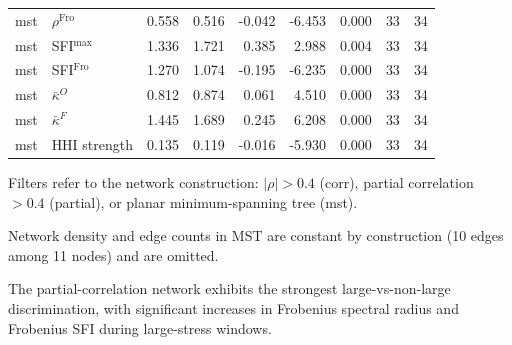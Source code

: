 \begin{table}[!htbp]
\begin{threeparttable}
\begin{tabular}{llrrrrrrr}
mst & $\rho^{\mathrm{Fro}}$ & 0.558 & 0.516 & -0.042 & -6.453 & 0.000 & 33 & 34 \\
mst & SFI$^{\max}$ & 1.336 & 1.721 & 0.385 & 2.988 & 0.004 & 33 & 34 \\
mst & SFI$^{\mathrm{Fro}}$ & 1.270 & 1.074 & -0.195 & -6.235 & 0.000 & 33 & 34 \\
mst & $\bar{\kappa}^O$ & 0.812 & 0.874 & 0.061 & 4.510 & 0.000 & 33 & 34 \\
mst & $\bar{\kappa}^F$ & 1.445 & 1.689 & 0.245 & 6.208 & 0.000 & 33 & 34 \\
mst & HHI strength & 0.135 & 0.119 & -0.016 & -5.930 & 0.000 & 33 & 34 \\
\bottomrule
\end{tabular}
\begin{tablenotes}\footnotesize
\item Filters refer to the network construction: $|\rho|>0.4$ (corr), partial correlation $>0.4$ (partial), or planar minimum-spanning tree (mst).
\item Network density and edge counts in MST are constant by construction (10 edges among 11 nodes) and are omitted.
\item The partial-correlation network exhibits the strongest large-vs-non-large discrimination, with significant increases in Frobenius spectral radius and Frobenius SFI during large-stress windows.
\end{tablenotes}
\end{threeparttable}
\end{table}
